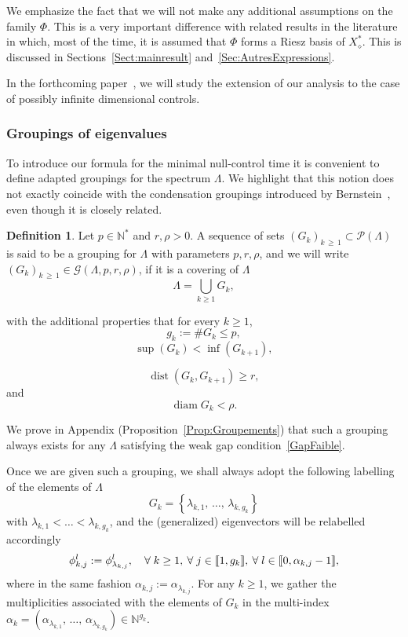 \documentclass[10pt]{amsart}
\theoremstyle{definition}\newtheorem{defi}[theo]{Definition}\newtheorem{rema}[theo]{Remark}\newtheorem{exam}[theo]{Example}\newtheorem{exem}[theo]{Example}\newtheorem{nota}[theo]{Notation}
\newcommand{\llbracket}{\mathopen{[\mkern -2.7mu[}}
\newcommand{\rrbracket}{\mathclose{]\mkern -2.7mu]}}
\newcommand{\inter}[2]{\llbracket #1,#2 \rrbracket}
\newcommand{\Xalphas}{X_\diamond^*}
\newcommand{\n}{g}
\newcommand{\N}{\mathbb{N}}
\DeclareMathOperator{\diam}{diam}
\DeclareMathOperator{\dist}{dist}
\let\oldforall\forall
\renewcommand*{\forall}{\mathrel{\oldforall}}
\begin{document}
We emphasize the fact that we will not make any additional assumptions on the family $\Phi$. This is a very important difference with related results in the literature in which, most of the time, it is assumed that $\Phi$ forms a Riesz basis of $\Xalphas$. This is discussed in Sections~\ref{Sect:mainresult} and~\ref{Sec:AutresExpressions}.


In the forthcoming paper~\cite{BoyerMorancey}, we will study the extension of our analysis to the case of possibly infinite dimensional controls.


\subsubsection{Groupings of eigenvalues} \label{Sec:Groupings}
To introduce our formula for the minimal null-control time it is convenient to define adapted groupings for the spectrum $\Lambda$. We highlight that this notion does not exactly coincide with the condensation groupings introduced by Bernstein~\cite{Bernstein33}, even though it is closely related.
\begin{defi} \label{Def:Groupements}
Let $p \in \N^*$ and $r,\rho >0$. A sequence of sets $(G_k)_{k\,\geq\,1} \subset \mathcal{P}(\Lambda)$ is said to be a grouping for $\Lambda$ with parameters $p, r, \rho$, and we will write $(G_k)_{k\,\geq \,1} \in \mathcal{G}(\Lambda,p,r,\rho)$, if it is a covering of $\Lambda$
\[
\Lambda = \bigcup\limits_{k \geq 1} G_k,
\]
\goodbreak

with the additional properties that for every $k \geq 1$,
\[
\n_k := \# G_k \leq p,
\]
\[
\sup(G_k) < \inf(G_{k+1}),
\]

\begin{equation}\label{ConstructionGroupement_distance}
\dist (G_k, G_{k+1}) \geq r,
\end{equation}
and
\begin{equation}\label{ConstructionGroupement_diametre}
\diam G_k < \rho.
\end{equation}
\end{defi}

We prove in Appendix (Proposition~\ref{Prop:Groupements}) that such a grouping always exists for any $\Lambda$ satisfying the weak gap condition~\eqref{GapFaible}.

Once we are given such a grouping, we shall always adopt the following labelling of the elements of $\Lambda$
\[
G_k = \left\{ \lambda_{k,1},\,\dots,\, \lambda_{k,\n_k} \right\}
\]
with $\lambda_{k,1} < \dots < \lambda_{k,\n_k}$, and the (generalized) eigenvectors will be relabelled accordingly
\[
\phi_{k,j}^l := \phi_{\lambda_{k,j}}^l, \quad \forall k\geq 1, \: \forall j\in \inter{1}{\n_k}, \: \forall l \in \inter{0}{\alpha_{k,j}-1},
\]
where in the same fashion $\alpha_{k,j} := \alpha_{\lambda_{k,j}}$. For any $k \geq 1$, we gather the multiplicities associated with the elements of $G_k$ in the multi-index $\alpha_k=(\alpha_{\lambda_{k,1}},\,\dotsc,\, \alpha_{\lambda_{k,\n_k}})\in \N^{\n_k}$.
\end{document}
